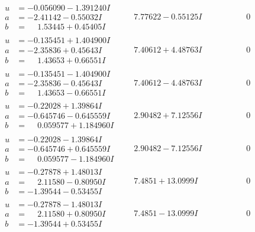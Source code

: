 \documentclass[1p]{elsarticle_modified}
\theoremstyle{definition}
\begin{document}
$$\begin{array}{c|c|c}
\begin{aligned}
u &= -0.056090 - 1.391240 I \\
a &= -2.41142 - 0.55032 I \\
b &= \phantom{-}1.53445 + 0.45405 I\end{aligned}
 & \phantom{-}7.77622 - 0.55125 I & \phantom{-0.000000 } 0 \\ \hline\begin{aligned}
u &= -0.135451 + 1.404900 I \\
a &= -2.35836 + 0.45643 I \\
b &= \phantom{-}1.43653 + 0.66551 I\end{aligned}
 & \phantom{-}7.40612 + 4.48763 I & \phantom{-0.000000 } 0 \\ \hline\begin{aligned}
u &= -0.135451 - 1.404900 I \\
a &= -2.35836 - 0.45643 I \\
b &= \phantom{-}1.43653 - 0.66551 I\end{aligned}
 & \phantom{-}7.40612 - 4.48763 I & \phantom{-0.000000 } 0 \\ \hline\begin{aligned}
u &= -0.22028 + 1.39864 I \\
a &= -0.645746 - 0.645559 I \\
b &= \phantom{-}0.059577 + 1.184960 I\end{aligned}
 & \phantom{-}2.90482 + 7.12556 I & \phantom{-0.000000 } 0 \\ \hline\begin{aligned}
u &= -0.22028 - 1.39864 I \\
a &= -0.645746 + 0.645559 I \\
b &= \phantom{-}0.059577 - 1.184960 I\end{aligned}
 & \phantom{-}2.90482 - 7.12556 I & \phantom{-0.000000 } 0 \\ \hline\begin{aligned}
u &= -0.27878 + 1.48013 I \\
a &= \phantom{-}2.11580 - 0.80950 I \\
b &= -1.39544 - 0.53455 I\end{aligned}
 & \phantom{-}7.4851 + 13.0999 I & \phantom{-0.000000 } 0 \\ \hline\begin{aligned}
u &= -0.27878 - 1.48013 I \\
a &= \phantom{-}2.11580 + 0.80950 I \\
b &= -1.39544 + 0.53455 I\end{aligned}
 & \phantom{-}7.4851 - 13.0999 I & \phantom{-0.000000 } 0\\

\end{array}$$
\end{document}
